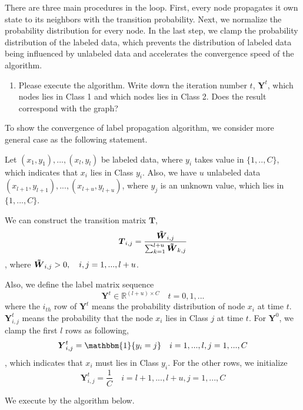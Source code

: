 \documentclass{article}
\begin{document}
\newpage
There are three main procedures in the loop. First, every node propagates it own state to its neighbors with the transition probability. Next, we normalize the probability distribution for every node. In the last step, we clamp the probability distribution of the labeled data, which prevents the distribution of labeled data being influenced by unlabeled data and accelerates the convergence speed of the algorithm.
\begin{enumerate}[resume]
\item Please execute the algorithm. Write down the iteration number $t$, $\boldsymbol{Y}^{t}$, which nodes lies in Class 1 and which nodes lies in Class 2. Does the result correspond with the graph?
\end{enumerate}

To show the convergence of label propagation algorithm, we consider more general case as the following statement.

Let $(x_1, y_1),...,(x_l,y_l)$ be labeled data, where $y_i$ takes value in $ \{ 1,..,C \} $, which indicates that $x_i$ lies in Class $y_i$. Also, we have $u$ unlabeled data  $(x_{l+1}, y_{l+1}),...,(x_{l+u},y_{l+u})$, where $y_j$ is an unknown value, which lies in $\{ 1,...,C \}$. 

We can construct the transition matrix $\boldsymbol{T}$,
$$\boldsymbol{T}_{i,j} = \frac{\boldsymbol{\Tilde{W}}_{i,j}}{\sum_{k=1}^{l+u} \boldsymbol{\Tilde{W}}_{k,j}}$$,
where $\boldsymbol{\Tilde{W}}_{i,j} > 0, \quad i,j = 1,..., l+u$.

Also, we define the label matrix sequence $$\boldsymbol{Y}^t \in \mathbb{R}^{(l+u) \times C} \quad t=0,1,...$$ where the $i_{th}$ row of $\boldsymbol{Y}^t$ means the probability distribution of node $x_i$ at time $t$. $\boldsymbol{Y}^t_{i,j}$ means the probability that the node $x_i$ lies in Class $j$ at time $t$. For $\boldsymbol{Y}^0$, we clamp the first $l$ rows as following,
$$\boldsymbol{Y}^{t}_{i,j}= \mathbbm{1}\{y_i=j\} \quad i = 1,...,l, j = 1,...,C$$,
which indicates that $x_i$ must lies in Class $y_i$. For the other rows, we initialize
$$\boldsymbol{Y}^{t}_{i,j}= \frac{1}{C} \quad i = l+1,...,l+u, j = 1,...,C$$

We execute by the algorithm below.
\end{document}
